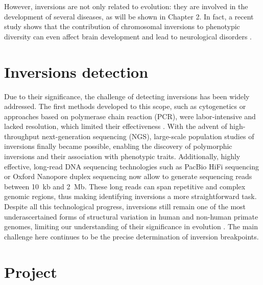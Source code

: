However, inversions are not only related to evolution: they are involved in the development of several diseases, as will be shown in Chapter 2. In fact, a recent study shows that the contribution of chromosomal inversions to phenotypic diversity can even affect brain development and lead to neurological disorders \cite{wang_chromosomal_2023}.

\section{Inversions detection}

Due to their significance, the challenge of detecting inversions has been widely addressed. The first methods developed to this scope, such as cytogenetics or approaches based on polymerase chain reaction (PCR), were labor‐intensive and lacked resolution, which limited their effectiveness \cite{hu_unravelling_2024}. With the advent of high-throughput next-generation sequencing (NGS), large-scale population studies of inversions finally became possible, enabling the discovery of polymorphic inversions and their association with phenotypic traits.
Additionally, highly effective, long‐read DNA sequencing technologies such as PacBio HiFi sequencing or Oxford Nanopore duplex sequencing now allow to generate sequencing reads between 10  kb and 2  Mb. These long reads can span repetitive and complex genomic regions, thus making identifying inversions a more straightforward task. Despite all this technological progress, inversions still remain one of the most underascertained forms of structural variation in human and non-human primate genomes, limiting our understanding of their significance in evolution \cite{porubsky_recurrent_2020}. The main challenge here continues to be the precise determination of inversion breakpoints.

\section{Project}

